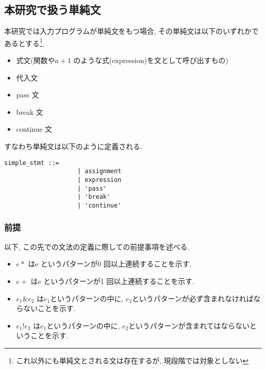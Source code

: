 \documentclass{jlreq}
\begin{document}
        \subsection{本研究で扱う単純文}
            本研究では入力プログラムが単純文をもつ場合, その単純文は以下のいずれかであるとする\footnote{これ以外にも単純文とされる文は存在するが, 現段階では対象としない}.
            \begin{itemize}
                \item 式文(関数や$a+1$ のような式(expression)を文として呼び出すもの)
                \item 代入文
                \item pass 文
                \item break 文
                \item continue 文
            \end{itemize}
            すなわち単純文は以下のように定義される.
            \begin{lstlisting}[caption=式の定義]
                simple_stmt ::=
                    | assignment
                    | expression 
                    | 'pass' 
                    | 'break' 
                    | 'continue' 
            \end{lstlisting}
            \subsubsection{前提}
                以下, この先での文法の定義に際しての前提事項を述べる.
                \begin{itemize}
                    \item $e*$ はe というパターンが0 回以上連続することを示す.
                    \item $e+$ はe というパターンが1 回以上連続することを示す.
                    \item $e_1 \&e_2$ は$e_1$というパターンの中に, $e_2$というパターンが必ず含まれなければならないことを示す.
                    \item $e_1 !e_2$ は$e_1$というパターンの中に, $e_2$というパターンが含まれてはならないということを示す.
                \end{itemize}
\end{document}
